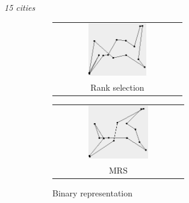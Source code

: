 \documentclass[10pt,a4paper,openbib]{article}
\makeatletter
\newcommand{\subsubfloat}[2]{%
  \begin{tabular}{@{}c@{}}#1\\#2\end{tabular}%
}
\makeatother
\begin{document}
\begin{multicols}{2}
\noindent \textit{15 cities} \\


\begin{figure}[H]
\begin{center}
    \begin{subfigure}[b]{0.24\textwidth}
    \begin{minipage}{\textwidth}\footnotesize

  		\subsubfloat{\includegraphics[width=0.48\textwidth]{images/result2/Binaryfalse6.png}}{Rank selection}\label{fig:cities15toursBR}
  		\subsubfloat{\includegraphics[width=0.48\textwidth]{images/result2/Binarytrue0.png}}{MRS}\label{fig:cities15toursOM}
 	\caption{Binary representation}\label{fig:cities15toursB}
  \end{minipage}
        
    \end{subfigure}
    \begin{subfigure}[b]{0.24\textwidth}
    \begin{minipage}{\textwidth}\footnotesize


\end{minipage}
\end{subfigure}
\end{center}
\end{figure}
\end{multicols}
\end{document}
